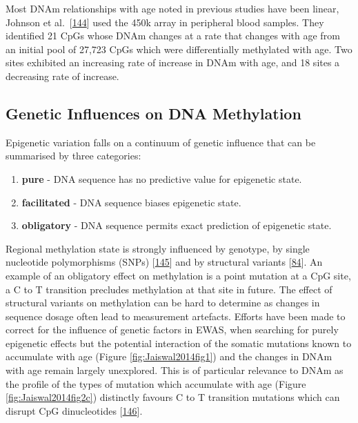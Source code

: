 \documentclass[
]{book}
\begin{document}
Most DNAm relationships with age noted in previous studies have been linear, Johnson et al.~{[}\protect\hyperlink{ref-Johnson2017}{144}{]} used the 450k array in peripheral blood samples.
They identified 21 CpGs whose DNAm changes at a rate that changes with age from an initial pool of 27,723 CpGs which were differentially methylated with age.
Two sites exhibited an increasing rate of increase in DNAm with age, and 18 sites a decreasing rate of increase.

\hypertarget{genetic-influences-on-dna-methylation}{%
\subsection{Genetic Influences on DNA Methylation}\label{genetic-influences-on-dna-methylation}}

Epigenetic variation falls on a continuum of genetic influence that can be summarised by three categories:

\begin{enumerate}
\def\labelenumi{\arabic{enumi}.}
\item
  \textbf{pure} - DNA sequence has no predictive value for epigenetic state.
\item
  \textbf{facilitated} - DNA sequence biases epigenetic state.
\item
  \textbf{obligatory} - DNA sequence permits exact prediction of epigenetic state.
\end{enumerate}

Regional methylation state is strongly influenced by genotype, by single nucleotide polymorphisms (SNPs) {[}\protect\hyperlink{ref-Smith2014a}{145}{]} and by structural variants {[}\protect\hyperlink{ref-Bell2017a}{84}{]}.
An example of an obligatory effect on methylation is a point mutation at a CpG site, a C to T transition precludes methylation at that site in future.
The effect of structural variants on methylation can be hard to determine as changes in sequence dosage often lead to measurement artefacts.
Efforts have been made to correct for the influence of genetic factors in EWAS, when searching for purely epigenetic effects but the potential interaction of the somatic mutations known to accumulate with age (Figure \ref{fig:Jaiswal2014fig1}) and the changes in DNAm with age remain largely unexplored.
This is of particular relevance to DNAm as the profile of the types of mutation which accumulate with age (Figure \ref{fig:Jaiswal2014fig2c}) distinctly favours C to T transition mutations which can disrupt CpG dinucleotides {[}\protect\hyperlink{ref-Jaiswal2014c}{146}{]}.
\end{document}
